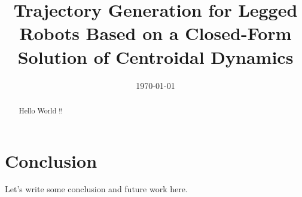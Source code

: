 \documentclass[12pt,a4paper,oneside]{article}
\title{Trajectory Generation for Legged Robots Based on a  Closed-Form Solution of Centroidal Dynamics}	                                    %
\date{\today}									    %
\theoremstyle{definition}
\theoremstyle{remark} %
\begin{document}

\newpage
\tableofcontents
\newpage
\begin{abstract}
\noindent
Hello World !! 
\end{abstract}
\newpage

\clearpage

\clearpage

\clearpage

\clearpage

\clearpage
\section{Conclusion}
Let's write some conclusion and future work here. 
\clearpage



\end{document}
